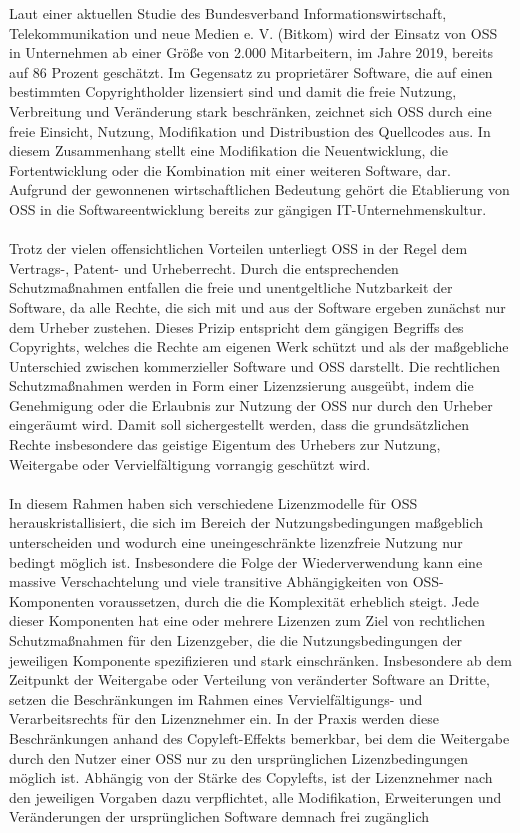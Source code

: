 Laut einer aktuellen Studie des Bundesverband Informationswirtschaft, Telekommunikation und neue Medien e. V. (Bitkom) wird der Einsatz von OSS in Unternehmen ab einer Größe von 2.000 Mitarbeitern, im Jahre 2019, bereits auf 86 Prozent geschätzt.\cite{bitkom_open_2020} Im Gegensatz zu proprietärer Software, die auf einen bestimmten Copyrightholder lizensiert sind und damit die freie Nutzung, Verbreitung und Veränderung stark beschränken, zeichnet sich OSS durch eine freie Einsicht, Nutzung, Modifikation und Distribustion des Quellcodes aus. In diesem Zusammenhang stellt eine Modifikation die Neuentwicklung, die Fortentwicklung oder die Kombination mit einer weiteren Software, dar. Aufgrund der gewonnenen wirtschaftlichen Bedeutung gehört die Etablierung von OSS in die Softwareentwicklung bereits zur gängigen IT-Unternehmenskultur.\cite[S. 21,22]{allmann_open_2019}\\\\ Trotz der vielen offensichtlichen Vorteilen unterliegt OSS in der Regel dem Vertrags-, Patent- und Urheberrecht.\cite[S. 28 ff.]{kesler_anpassung_2013} Durch die entsprechenden Schutzmaßnahmen entfallen die freie und unentgeltliche Nutzbarkeit der Software, da alle Rechte, die sich mit und aus der Software ergeben zunächst nur dem Urheber zustehen. Dieses Prizip entspricht dem gängigen Begriffs des Copyrights, welches die Rechte am eigenen Werk schützt und als der maßgebliche Unterschied zwischen kommerzieller Software und OSS darstellt. Die rechtlichen Schutzmaßnahmen werden in Form einer Lizenzsierung ausgeübt, indem die Genehmigung oder die Erlaubnis zur Nutzung der OSS nur durch den Urheber eingeräumt wird.\cite{wilmer_rechtliche_2021} Damit soll sichergestellt werden, dass die grundsätzlichen Rechte insbesondere das geistige Eigentum des Urhebers zur Nutzung, Weitergabe oder Vervielfältigung vorrangig geschützt wird.\\\\ In diesem Rahmen haben sich verschiedene Lizenzmodelle für OSS herauskristallisiert, die sich im Bereich der Nutzungsbedingungen maßgeblich unterscheiden und wodurch eine uneingeschränkte lizenzfreie Nutzung nur bedingt möglich ist.\cite{wilmer_rechtliche_2021} Insbesondere die Folge der Wiederverwendung kann eine massive Verschachtelung und viele transitive Abhängigkeiten von OSS-Komponenten voraussetzen, durch die die Komplexität erheblich steigt. Jede dieser Komponenten hat eine oder mehrere Lizenzen zum Ziel von rechtlichen Schutzmaßnahmen für den Lizenzgeber, die die Nutzungsbedingungen der jeweiligen Komponente spezifizieren und stark einschränken. Insbesondere ab dem Zeitpunkt der Weitergabe oder Verteilung von veränderter Software an Dritte, setzen die Beschränkungen im Rahmen eines Vervielfältigungs- und Verarbeitsrechts für den Lizenznehmer ein. In der Praxis werden diese Beschränkungen anhand des Copyleft-Effekts bemerkbar, bei dem die Weitergabe durch den Nutzer einer OSS nur zu den ursprünglichen Lizenzbedingungen möglich ist. \cite[S. 184]{sujecki_vertrags-_2005} Abhängig von der Stärke des Copylefts, ist der Lizenznehmer nach den jeweiligen Vorgaben dazu verpflichtet, alle Modifikation, Erweiterungen und Veränderungen der ursprünglichen Software demnach frei zugänglich 